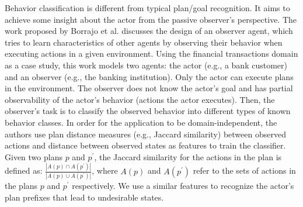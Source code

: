 Behavior classification is different from typical plan/goal recognition. 
It aims to achieve some insight about the actor from the passive observer's perspective. The work proposed by Borrajo et al. \citeyear{borrajo2020domainindependent} discusses the design of an observer agent, which tries to learn characteristics of other agents by observing their behavior when executing actions in a given environment. 
Using the financial transactions domain as a case study, this work models two agents: the actor (e.g., a bank customer) and an observer (e.g., the banking institution). Only the actor can execute plans in the environment. The observer does not know the actor's goal and has partial observability of the actor's behavior (actions the actor executes). Then, the observer's task is to classify the observed behavior into different types of known behavior classes. In order for the application to be domain-independent, the authors use plan distance measures (e.g., Jaccard similarity) between observed actions and distance between observed states as features to train the classifier.
Given two plans $p$ and $p^\prime$, the Jaccard similarity for the actions in the plan is defined as: 
$\frac{\left | A(p)\cap A(p^\prime) \right |}{\left | A(p)\cup A(p^\prime) \right |}$, where $A(p)$ and  $A(p^\prime)$ refer to the sets of actions in the plans $p$ and $p^\prime$ respectively.
We use a similar features to recognize the actor's plan prefixes that lead to undesirable states.

